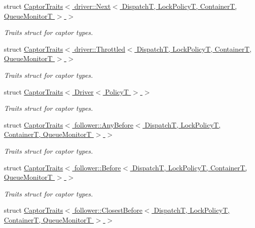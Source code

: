 \begin{DoxyCompactItemize}
struct \hyperlink{structflow_1_1_captor_traits_3_01driver_1_1_next_3_01_dispatch_t_00_01_lock_policy_t_00_01_contacacf8f9584444cf22afe31e8b706b576}{Captor\+Traits$<$ driver\+::\+Next$<$ Dispatch\+T, Lock\+Policy\+T, Container\+T, Queue\+Monitor\+T $>$ $>$}
\begin{DoxyCompactList}\small\item\em Traits struct for captor types. \end{DoxyCompactList}\item 
struct \hyperlink{structflow_1_1_captor_traits_3_01driver_1_1_throttled_3_01_dispatch_t_00_01_lock_policy_t_00_01_a55b272e8914e815b1e61540d6e370f1}{Captor\+Traits$<$ driver\+::\+Throttled$<$ Dispatch\+T, Lock\+Policy\+T, Container\+T, Queue\+Monitor\+T $>$ $>$}
\begin{DoxyCompactList}\small\item\em Traits struct for captor types. \end{DoxyCompactList}\item 
struct \hyperlink{structflow_1_1_captor_traits_3_01_driver_3_01_policy_t_01_4_01_4}{Captor\+Traits$<$ Driver$<$ Policy\+T $>$ $>$}
\begin{DoxyCompactList}\small\item\em Traits struct for captor types. \end{DoxyCompactList}\item 
struct \hyperlink{structflow_1_1_captor_traits_3_01follower_1_1_any_before_3_01_dispatch_t_00_01_lock_policy_t_00_55050b2eb17fc5bc754f0ec7f3a869fd}{Captor\+Traits$<$ follower\+::\+Any\+Before$<$ Dispatch\+T, Lock\+Policy\+T, Container\+T, Queue\+Monitor\+T $>$ $>$}
\begin{DoxyCompactList}\small\item\em Traits struct for captor types. \end{DoxyCompactList}\item 
struct \hyperlink{structflow_1_1_captor_traits_3_01follower_1_1_before_3_01_dispatch_t_00_01_lock_policy_t_00_01_c62c65191d3908e10afd70708af893571}{Captor\+Traits$<$ follower\+::\+Before$<$ Dispatch\+T, Lock\+Policy\+T, Container\+T, Queue\+Monitor\+T $>$ $>$}
\begin{DoxyCompactList}\small\item\em Traits struct for captor types. \end{DoxyCompactList}\item 
struct \hyperlink{structflow_1_1_captor_traits_3_01follower_1_1_closest_before_3_01_dispatch_t_00_01_lock_policy_t8b834bc2517b16c76af22e1a13353500}{Captor\+Traits$<$ follower\+::\+Closest\+Before$<$ Dispatch\+T, Lock\+Policy\+T, Container\+T, Queue\+Monitor\+T $>$ $>$}

\end{DoxyCompactItemize}
